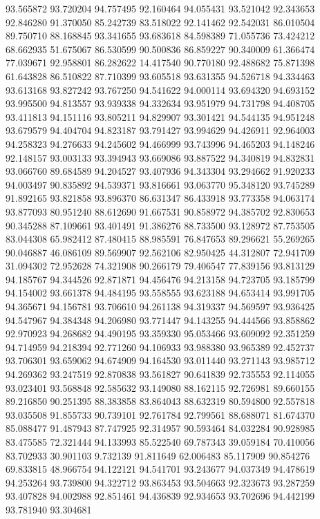 93.565872
93.720204
94.757495
92.160464
94.055431
93.521042
92.343653
92.846280
91.370050
85.242739
83.518022
92.141462
92.542031
86.010504
89.750710
88.168845
93.341655
93.683618
84.598389
71.055736
73.424212
68.662935
51.675067
86.530599
90.500836
86.859227
90.340009
61.366474
77.039671
92.958801
86.282622
14.417540
90.770180
92.488682
75.871398
61.643828
86.510822
87.710399
93.605518
93.631355
94.526718
94.334463
93.613168
93.827242
93.767250
94.541622
94.000114
93.694320
94.693152
93.995500
94.813557
93.939338
94.332634
93.951979
94.731798
94.408705
93.411813
94.151116
93.805211
94.829907
93.301421
94.544135
94.951248
93.679579
94.404704
94.823187
93.791427
93.994629
94.426911
92.964003
94.258323
94.276633
94.245602
94.466999
93.743996
94.465203
94.148246
92.148157
93.003133
93.394943
93.669086
93.887522
94.340819
94.832831
93.066760
89.684589
94.204527
93.407936
94.343304
93.294662
91.920233
94.003497
90.835892
94.539371
93.816661
93.063770
95.348120
93.745289
91.892165
93.821858
93.896370
86.631347
86.433918
93.773358
94.063174
93.877093
80.951240
88.612690
91.667531
90.858972
94.385702
92.830653
90.345288
87.109661
93.401491
91.386276
88.733500
93.128972
87.753505
83.044308
65.982412
87.480415
88.985591
76.847653
89.296621
55.269265
90.046887
46.086109
89.569907
92.562106
82.950425
44.312807
72.941709
31.094302
72.952628
74.321908
90.266179
79.406547
77.839156
93.813129
94.185767
94.344526
92.871871
94.456476
94.213158
94.723705
93.185799
94.154002
93.661378
94.484195
93.558555
93.623188
94.653414
93.991705
94.365671
94.156781
93.706610
94.261138
94.319337
94.569597
93.936425
94.547967
94.384348
94.206980
93.771447
94.143255
94.444566
93.858862
92.970923
94.268682
94.490195
93.359330
95.053466
93.609092
92.351259
94.714959
94.218394
92.771260
94.106933
93.988380
93.965389
92.452737
93.706301
93.659062
94.674909
94.164530
93.011440
93.271143
93.985712
94.269362
93.247519
92.870838
93.561827
90.641839
92.735553
92.114055
93.023401
93.568848
92.585632
93.149080
88.162115
92.726981
89.660155
89.216850
90.251395
88.383858
83.864043
88.632319
80.594800
92.557818
93.035508
91.855733
90.739101
92.761784
92.799561
88.688071
81.674370
85.088477
91.487943
87.747925
92.314957
90.593464
84.032284
90.928985
83.475585
72.321444
94.133993
85.522540
69.787343
39.059184
70.410056
83.702933
30.901103
9.732139
91.811649
62.006483
85.117909
90.854276
69.833815
48.966754
94.122121
94.541701
93.243677
94.037349
94.478619
94.253264
93.739800
94.322712
93.863453
93.504663
92.323673
93.287259
93.407828
94.002988
92.851461
94.436839
92.934653
93.702696
94.442199
93.781940
93.304681
